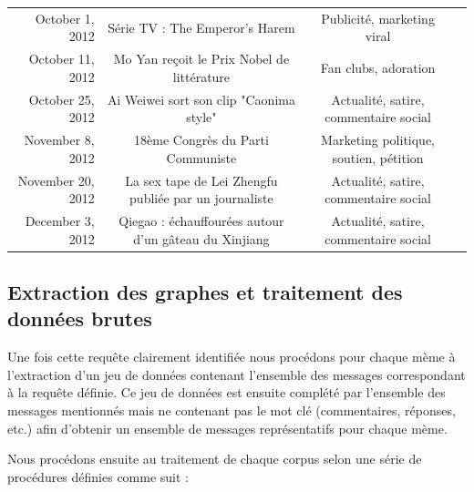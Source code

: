 \begin{landscape}
\begin{table}
\begin{tabulary}{\linewidth}{ r| C C C}
        October 1, 2012 &
        Série TV : The Emperor's Harem & 
        Publicité, marketing viral &
         \\

        October 11, 2012  &
        Mo Yan reçoit le Prix Nobel de littérature &
        Fan clubs, adoration  &
         \\

        October 25, 2012 &
        Ai Weiwei sort son clip "Caonima style"&
        Actualité, satire, commentaire social &
        \\

        November 8, 2012 &
        18ème Congrès du Parti Communiste &
        Marketing politique, soutien, pétition &
        \\

        November 20, 2012 &
        La sex tape de Lei Zhengfu publiée par un journaliste &
        Actualité, satire, commentaire social &
        \\

        December 3, 2012  &
        Qiegao : échauffourées autour d'un gâteau du Xinjiang &
        Actualité, satire, commentaire social &
        \\

    \end{tabulary}
\end{table}
\end{landscape}

\subsection{Extraction des graphes et traitement des données brutes}
Une fois cette requ\^ete clairement identifiée nous procédons pour
chaque mème à l{\textquoteright}extraction d{\textquoteright}un jeu
de données contenant l{\textquoteright}ensemble des messages
correspondant à la requ\^ete définie. Ce jeu de données est
ensuite complété par l{\textquoteright}ensemble des messages
mentionnés mais ne contenant pas le mot clé (commentaires,
réponses, etc.) afin d{\textquoteright}obtenir un ensemble de
messages représentatifs pour chaque mème.

Nous procédons ensuite au traitement de chaque corpus selon une
série de procédures définies comme suit :

